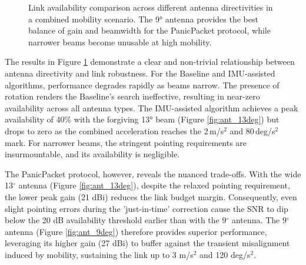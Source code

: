 \documentclass[fleqn,10pt]{wlscirep}
\newcommand{\legline}[2]{%
    \tikz[baseline=-0.5ex]{
        \draw[#1, #2, line width=1.5pt] (0,0) -- (0.5,0);
    }%
}
\begin{document}
\begin{figure}[ht!]
    
    \caption{Link availability comparison across different antenna directivities in a combined mobility scenario. The 9° antenna provides the best balance of gain and beamwidth for the PanicPacket protocol, while narrower beams become unusable at high mobility.}
    \label{fig:antenna_comparison}
\end{figure}

The results in Figure \ref{fig:antenna_comparison} demonstrate a clear and non-trivial relationship between antenna directivity and link robustness. For the Baseline and IMU-assisted algorithms, performance degrades rapidly as beams narrow. The presence of rotation renders the Baseline's search ineffective, resulting in near-zero availability across all antenna types. The IMU-assisted algorithm achieves a peak availability of 40\% with the forgiving 13° beam (Figure \ref{fig:ant_13deg}) but drops to zero as the combined acceleration reaches the 2\,m/s$^2$ and 80\,deg/s$^2$ mark. For narrower beams, the stringent pointing requirements are insurmountable, and its availability is negligible.

The PanicPacket protocol, however, reveals the nuanced trade-offs. With the wide 13$^{\circ}$ antenna (Figure \ref{fig:ant_13deg}), despite the relaxed pointing requirement, the lower peak gain (21 dBi) reduces the link budget margin. Consequently, even slight pointing errors during the 'just-in-time' correction cause the SNR to dip below the 20 dB availability threshold earlier than with the 9$^{\circ}$ antenna. The 9$^{\circ}$ antenna (Figure \ref{fig:ant_9deg}) therefore provides superior performance, leveraging its higher gain (27 dBi) to buffer against the transient misalignment induced by mobility, sustaining the link up to 3 m/s$^2$ and 120 deg/s$^2$.
\end{document}
